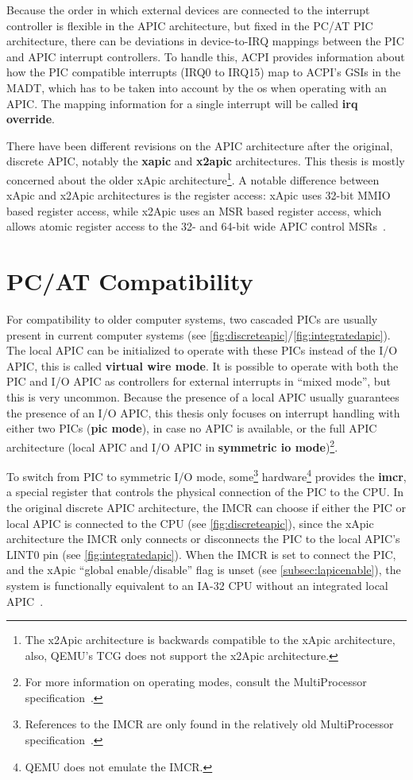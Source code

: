 Because the order in which external devices are connected to the interrupt controller is flexible
in the APIC architecture, but fixed in the PC/AT PIC architecture, there can be deviations in
device-to-IRQ mappings between the PIC and APIC interrupt controllers. To handle this, ACPI
provides information about how the PIC compatible interrupts (IRQ0 to IRQ15) map to ACPI's GSIs in
the MADT, which has to be taken into account by the os when operating with an APIC. The mapping
information for a single interrupt will be called \textbf{\gls{irq override}}.

There have been different revisions on the APIC architecture after the original, discrete APIC,
notably the \textbf{\gls{xapic}} and \textbf{\gls{x2apic}} architectures. This thesis is mostly
concerned about the older xApic architecture\footnote{The x2Apic architecture is backwards
  compatible to the xApic architecture, also, QEMU's TCG does not support the x2Apic architecture.}.
A notable difference between xApic and x2Apic architectures is the register access: xApic uses
32-bit MMIO based register access, while x2Apic uses an MSR based register access, which allows
atomic register access to the 32- and 64-bit wide APIC control MSRs~\cite[sec.~3.11.12]{ia32}.

\section{PC/AT Compatibility}
\label{sec:pcatcompat}

For compatibility to older computer systems, two cascaded PICs are usually present in current
computer systems (see \autoref{fig:discreteapic}/\autoref{fig:integratedapic}). The local APIC can
be initialized to operate with these PICs instead of the I/O APIC, this is called
\textbf{\gls{virtual wire mode}}. It is possible to operate with both the PIC and I/O APIC as
controllers for external interrupts in ``mixed mode'', but this is very uncommon. Because the
presence of a local APIC usually guarantees the presence of an I/O APIC, this thesis only focuses
on interrupt handling with either two PICs (\textbf{\gls{pic mode}}), in case no APIC is available,
or the full APIC architecture (local APIC and I/O APIC in \textbf{\gls{symmetric io
    mode}})\footnote{For more information on operating modes, consult the MultiProcessor
  specification~\cite[sec.~3.6.2.1]{mpspec}.}.

To switch from PIC to symmetric I/O mode, some\footnote{References to the IMCR are only found in
  the relatively old MultiProcessor specification~\cite{mpspec}.} hardware\footnote{QEMU does not
  emulate the IMCR.} provides the \textbf{\gls{imcr}}, a special register that controls the physical
connection of the PIC to the CPU. In the original discrete APIC architecture, the IMCR can choose
if either the PIC or local APIC is connected to the CPU (see \autoref{fig:discreteapic}), since the
xApic architecture the IMCR only connects or disconnects the PIC to the local APIC's LINT0 pin (see
\autoref{fig:integratedapic}). When the IMCR is set to connect the PIC, and the xApic ``global
enable/disable'' flag is unset (see \autoref{subsec:lapicenable}), the system is functionally
equivalent to an IA-32 CPU without an integrated local APIC~\cite[sec.~3.11.4.3]{ia32}.

